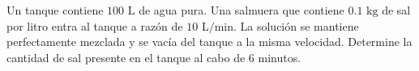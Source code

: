 \item Un tanque contiene $100 \text{ L}$ de agua pura. Una salmuera que contiene $0.1 \text{ kg}$ de sal por litro entra al tanque a razón de $10 \text{ L/min}$. La solución se mantiene perfectamente mezclada y se vacía del tanque a la misma velocidad. Determine la cantidad de sal presente en el tanque al cabo de 6 minutos.

